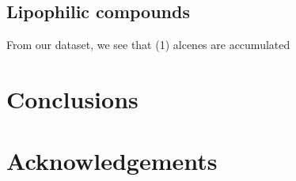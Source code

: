 \documentclass[preprint,review,12pt]{elsarticle}
\begin{document}
\subsection{Lipophilic compounds}

From our dataset, we see that (1) alcenes are accumulated

\section{Conclusions}


\section{Acknowledgements}







\end{document}
